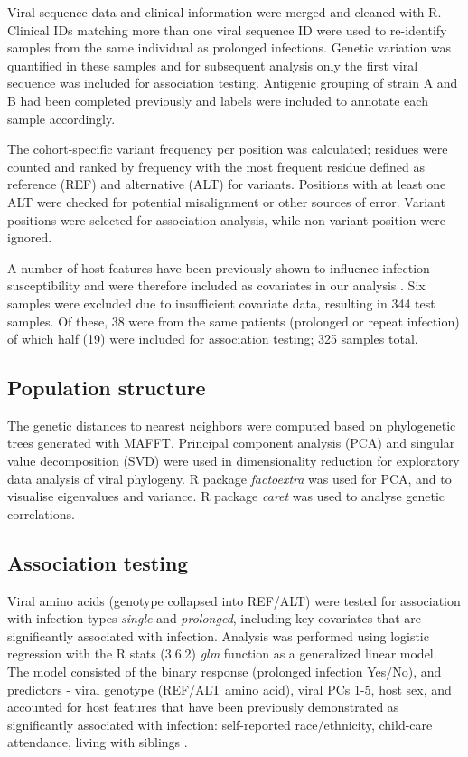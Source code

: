 \documentclass{article} %
\begin{document}
Viral sequence data and clinical information were merged and cleaned with R.
Clinical IDs matching more than one viral sequence ID were used to re-identify samples from the same individual as prolonged infections. 
Genetic variation was quantified in these samples and for subsequent analysis only the first viral sequence was included for association testing. 
Antigenic grouping of strain A and B had been completed previously and labels were included to annotate each sample accordingly.

The cohort-specific variant frequency per position was calculated;
residues were counted and ranked by frequency
with the most frequent residue defined as reference (REF) and alternative (ALT) for variants.
Positions with at least one ALT were checked for potential misalignment or other sources of error. 
Variant positions were selected for association analysis, while non-variant position were ignored.

A number of host features have been previously shown to influence infection susceptibility and were therefore included as covariates in our analysis 
\citep{rosas2022upper}.
Six samples were excluded due to insufficient covariate data, resulting in 344 test samples. 
Of these, 38 were from the same patients (prolonged or repeat infection) of which half (19) were included for association testing; 325 samples total.

\subsection{Population structure}
The genetic distances to nearest neighbors were computed based on phylogenetic 
trees generated with MAFFT.
Principal component analysis (PCA) and singular value decomposition (SVD) were used in dimensionality reduction for exploratory data analysis of viral phylogeny.
R package \textit{factoextra} was used for PCA, and to visualise eigenvalues and variance. 
R package \textit{caret} was used to analyse genetic correlations.

\subsection{Association testing}
Viral amino acids (genotype collapsed into REF/ALT) were tested for association with infection types \textit{single} and \textit{prolonged}, 
including key covariates that are significantly associated with infection.
Analysis was performed using logistic regression with the
R stats (3.6.2) \textit{glm} function as a generalized linear model.
The model consisted of the binary response (prolonged infection Yes/No), and predictors - viral genotype (REF/ALT amino acid), viral PCs 1-5, host sex, and accounted for host features that have been previously demonstrated as significantly associated with infection: 
self-reported race/ethnicity, child-care attendance, living with siblings 
\citep{rosas2022upper}.
\end{document}
